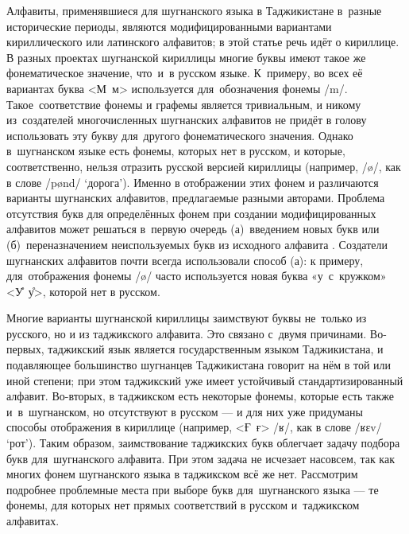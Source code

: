 Алфавиты, применявшиеся для шугнанского языка в Таджикистане в~разные исторические периоды, являются модифицированными вариантами кириллического или латинского алфавитов; в этой статье речь идёт о кириллице. В разных проектах шугнанской кириллицы многие буквы имеют такое же фонематическое значение, что~и~в русском языке. К~примеру, во всех её вариантах буква <М~м> используется для~обозначения фонемы /m/. Такое~соответствие фонемы и графемы является тривиальным, и никому из~создателей многочисленных шугнанских алфавитов не придёт в голову использовать эту букву для~другого фонематического значения. Однако в~шугнанском языке есть фонемы, которых нет в русском, и которые, соответственно, нельзя отразить русской версией кириллицы (например, /ø/, как в слове /pønd/ ‘дорога’). Именно в отображении этих фонем и различаются варианты шугнанских алфавитов, предлагаемые разными авторами. Проблема отсутствия букв для определённых фонем при создании модифицированных алфавитов может решаться в~первую очередь (а)~введением новых букв или (б)~переназначением неиспользуемых букв из исходного алфавита \parencite[325]{lupke2011}. Создатели шугнанских алфавитов почти всегда использовали способ (а): к примеру, для~отображения фонемы /ø/ часто используется новая буква «у~с~кружком» <У̊~у̊>, которой нет в русском.

Многие варианты шугнанской кириллицы заимствуют буквы не~только из русского, но и из таджикского алфавита. Это связано с~двумя причинами. Во-первых, таджикский язык является государственным языком Таджикистана, и подавляющее большинство шугнанцев Таджикистана говорит на нём в той или иной степени; при этом таджикский уже имеет устойчивый стандартизированный алфавит. Во-вторых, в таджикском есть некоторые фонемы, которые есть также и~в~шугнанском, но отсутствуют в русском — и для них уже придуманы способы отображения в кириллице (например, <Ғ~ғ> /ʁ/, как в слове /ʁɛv/ ‘рот’). Таким образом, заимствование таджикских букв облегчает задачу подбора букв для~шугнанского алфавита. При этом задача не исчезает насовсем, так как многих фонем шугнанского языка в таджикском всё же нет. Рассмотрим подробнее проблемные места при выборе букв для~шугнанского языка — те фонемы, для которых нет прямых соответствий в русском и~таджикском алфавитах.


